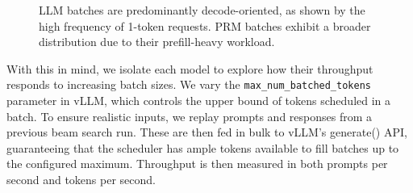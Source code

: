 \documentclass[12pt,twoside]{report}
\begin{document}
\begin{figure}[htbp]
\centering
{}
\vspace{1em}
\caption{LLM batches are predominantly decode-oriented, as shown by the high frequency of 1-token requests. PRM batches exhibit a broader distribution due to their prefill-heavy workload.}
\label{fig:batch-hist-comparison}
\end{figure}

With this in mind, we isolate each model to explore how their throughput responds to increasing batch sizes. 
We vary the \texttt{max\_num\_batched\_tokens} parameter in vLLM, which controls the upper bound of tokens scheduled in a batch. 
To ensure realistic inputs, we replay prompts and responses from a previous beam search run. 
These are then fed in bulk to vLLM's generate() API, guaranteeing that the scheduler has ample tokens available to fill batches up to the configured maximum. 
Throughput is then measured in both prompts per second and tokens per second.
\end{document}
